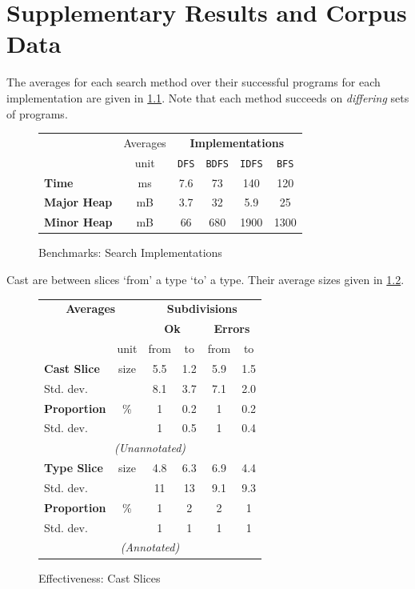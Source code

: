 \chapter{Supplementary Results and Corpus Data}
\label{sec:results}
The averages for each search method over their successful programs for each implementation are given in \cref{fig:SearchPerformance}. Note that each method succeeds on \textit{differing} sets of programs.

\begin{figure}
  \centering
  \begin{tabular}{lc|cccc}
  & Averages & \multicolumn{4}{c}{\textbf{Implementations}}\\
   & unit & \texttt{DFS} & \texttt{BDFS} & \texttt{IDFS} & \texttt{BFS}\\
   \hline
   \textbf{Time} & ms &  7.6 & 73 & 140 & 120\\
   \textbf{Major Heap} & mB & 3.7 & 32 & 5.9 & 25\\
   \textbf{Minor Heap} & mB & 66 & 680 & 1900 & 1300
  \end{tabular}
  
\caption{Benchmarks: Search Implementations}
\label{fig:SearchPerformance}
\end{figure}


Cast are between slices `from' a type `to' a type. Their average sizes given in \cref{fig:CastSlicingEffectiveness}.

\begin{figure}[h]
  \centering
  \begin{tabular}{lc|cc|cc}
  \multicolumn{2}{c}{\textbf{Averages}} & \multicolumn{4}{c}{\textbf{Subdivisions}}\\
  & & \multicolumn{2}{c|}{\textbf{Ok}} & \multicolumn{2}{c}{\textbf{Errors}}\\ 
   & unit & from & to & from & to\\
   \hline
   \textbf{Cast Slice} & size &  5.5 & 1.2 & 5.9 & 1.5 \\
   Std. dev. &  				 &  8.1 & 3.7 & 7.1 & 2.0\\
   \textbf{Proportion}& \%    & 1 & 0.2 & 1 & 0.2\\
   Std. dev. &  				 &  1 & 0.5 & 1 & 0.4\\
   \multicolumn{6}{c}{\textit{(Unannotated)}}\\
   \textbf{Type Slice} & size &  4.8 & 6.3 & 6.9 & 4.4  \\
   Std. dev. 			&    &  11 & 13 & 9.1 & 9.3\\
   \textbf{Proportion}& \% 	 & 1 & 2 & 2 & 1\\
   Std. dev. &  				 &  1 & 1 & 1 & 1\\
   \multicolumn{6}{c}{\textit{(Annotated)}}
  \end{tabular}
  \caption{Effectiveness: Cast Slices}
\label{fig:CastSlicingEffectiveness}
\end{figure}

